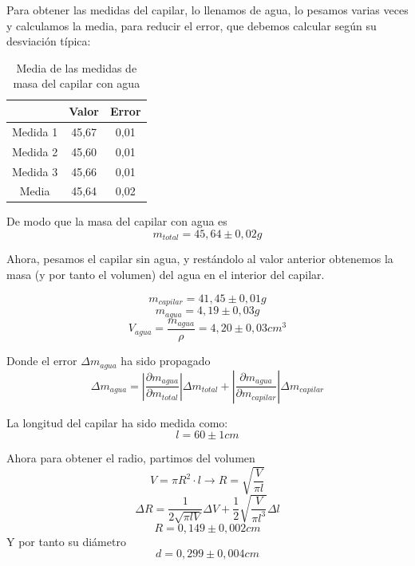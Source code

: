 \documentclass[a4paper,12pt,spanish]{article}
\begin{document}
	\vspace{\baselineskip}
	
	
	Para obtener las medidas del capilar, lo llenamos de agua, lo pesamos varias veces y calculamos la media, para reducir el error, que debemos calcular según su desviación típica:
	
	
	\begin{table}[H]
		\centering
		\begin{tabular}{c|c|c|}
			\cline{2-3}
			& Valor & Error \\ \hline
			\multicolumn{1}{|c|}{Medida 1} & 45,67 & 0,01 \\ \hline
			\multicolumn{1}{|c|}{Medida 2} & 45,60 & 0,01 \\ \hline
			\multicolumn{1}{|c|}{Medida 3} & 45,66 & 0,01 \\ \hline\hline								
			\multicolumn{1}{|c|}{Media} & 45,64 & 0,02 \\ \hline
		\end{tabular}
	\caption{Media de las medidas de masa del capilar con agua}
	\end{table}
	
	
	De modo que la masa del capilar con agua es 
	\[ m_{total} = 45,64 \pm 0,02 \si{g} \]
	
	Ahora, pesamos el capilar sin agua, y restándolo al valor anterior obtenemos la masa (y por tanto el volumen) del agua en el interior del capilar.
	

	\[m_{capilar} = 41,45\pm 0,01 \si{g}\]
	\[ m_{agua} = 4,19 \pm 0,03 \si{g}\]
	\[V_{agua} = \frac{m_{agua}}{\rho} = 4,20 \pm 0,03 \si{cm^3}\]
	
	Donde el error $\Delta m_{agua}$ ha sido propagado
	\[ \Delta m_{agua} = \left|\frac{\partial m_{agua}}{\partial m_{total}}\right|\Delta m_{total} + \left|\frac{\partial m_{agua}}{\partial m_{capilar}}\right|\Delta m_{capilar}
	\]
	
	\vspace{\baselineskip}
	
	La longitud del capilar ha sido medida como:
	\[l = 60\pm 1\si{cm} \]
	
	
	
	
	\vspace{\baselineskip}
	
	
	
	
	
	Ahora para obtener el radio, partimos del volumen
	\[V = \pi R^2 \cdot l \longrightarrow R = \sqrt{\frac{V}{\pi l}}\]
	\[ \Delta R = \frac{1}{2\sqrt{\pi l V}} \Delta V + \frac{1}{2}\sqrt{\frac{V}{\pi l^3}}\Delta l
	\]
	\[ R = 0,149 \pm 0,002 \si{cm}
	\]
	Y por tanto su diámetro
	\[ d = 0,299\pm 0,004 \si{cm}
	\]
	
\end{document}
